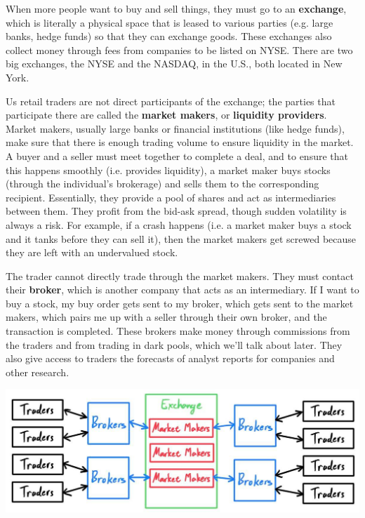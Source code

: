 \documentclass{article}
\begin{document}
    When more people want to buy and sell things, they must go to an \textbf{exchange}, which is literally a physical space that is leased to various parties (e.g. large banks, hedge funds) so that they can exchange goods. These exchanges also collect money through fees from companies to be listed on NYSE. There are two big exchanges, the NYSE and the NASDAQ, in the U.S., both located in New York. 

    Us retail traders are not direct participants of the exchange; the parties that participate there are called the \textbf{market makers}, or \textbf{liquidity providers}. Market makers, usually large banks or financial institutions (like hedge funds), make sure that there is enough trading volume to ensure liquidity in the market. A buyer and a seller must meet together to complete a deal, and to ensure that this happens smoothly (i.e. provides liquidity), a market maker buys stocks (through the individual's brokerage) and sells them to the corresponding recipient. Essentially, they provide a pool of shares and act as intermediaries between them. They profit from the bid-ask spread, though sudden volatility is always a risk. For example, if a crash happens (i.e. a market maker buys a stock and it tanks before they can sell it), then the market makers get screwed because they are left with an undervalued stock. 

    The trader cannot directly trade through the market makers. They must contact their \textbf{broker}, which is another company that acts as an intermediary. If I want to buy a stock, my buy order gets sent to my broker, which gets sent to the market makers, which pairs me up with a seller through their own broker, and the transaction is completed. These brokers make money through commissions from the traders and from trading in dark pools, which we'll talk about later. They also give access to traders the forecasts of analyst reports for companies and other research. 

    \begin{center}
        \includegraphics[scale=0.3]{img/exchange.jpg}
    \end{center}
\end{document}
